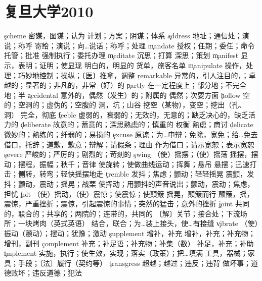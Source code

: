 \section{复旦大学2010}
\begin{multicols}{2}
\c{scheme}  \v 密谋，图谋；认为 \n 计划；方案；阴谋；体系
\c{address}  \n 地址；通信处；演说；称呼 \v 寄给；演说；向…说话；称呼；处理
\c{mandate}  \n 授权；任期；委任；命令 \vt 托管；批准 \vi 强制执行；委托办理
\c{meditate}  \vi 沉思；打算 \vt 深思；策划
\c{manifest}  \vt 显示，表明；证明；使显现 \a 明白的，明显的 \n 货单，旅客名单
\c{manipulate}  \vt 操作，处理；巧妙地控制；操纵；〔医〕推拿，调整
\c{remarkable}  \a 异常的，引人注目的，；卓越的；显著的；非凡的，非常（好）的
\c{partly}  \ad 在一定程度上；部分地；不完全地；半
\c{accidental}  \a 意外的，偶然（发生）的；附属的 \n 偶然；次要方面
\c{hollow}  \a 空的；空洞的；虚伪的；空腹的 \n 洞，坑；山谷 \v 挖空（某物），变空；挖出（孔、洞） \ad 完全，彻底
\c{feeble}  \a 虚弱的，衰弱的；无效的，无意的；缺乏决心的，缺乏活力的
\c{deliberate}  \a 故意的；蓄意的；深思熟虑的；慎重的 \vt 权衡 \vi 熟虑；商讨
\c{delicate}  \a 微妙的；熟练的；纤弱的；易损的
\c{excuse}  \vt 原谅；为…申辩；免除，宽免；给…免去 \n 借口，托辞；道歉，歉意；辩解；请假条；理由 \vi 作为借口；请示宽恕；表示宽恕
\c{severe}  \a 严峻的；严厉的；剧烈的；苛刻的
\c{swing}  \v （使）摇摆；（使）摇荡 \n 摇摆，摆动；摆程，振幅；秋千；音律 \vt 使旋转；使做曲线运动；挥舞；悬吊 \vi 悬摆；迅速打击；侧转，转弯；轻快摇摆地走
\c{tremble}  \vi 发抖；焦虑；颤动；轻轻摇晃 \n 震颤，发抖；颤动，震动；摇晃；战栗 \vt 使挥动；用颤抖的声音说出；颤动，震动；焦虑，担忧
\c{jolt}  \vt （使）摇动，（使）震惊；使震惊；使颠簸 \vi 摇晃，颠簸而行 \n 颠簸，摇，震惊，严重挫折；震惊，引起震惊的事情；突然的猛击；意外的挫折
\c{joint}  \a 共同的，联合的；共享的；两院的；连带的，共同的 \n 〔解〕关节；接合处；下流场所；一块烤肉（英式英语） \vt 结合，联合；为…装上接头，使…有接缝
\c{vibrate}  \v （使）振动（颤动）；摆动；犹豫；激动
\c{supplement}  \vt 增补，补充 \n 增补，补充；补充物；增刊，副刊
\c{complement}  \n 补充；补足语；补充物；补集（数） \vt 补足，补充；补助
\c{implement}  \vt 实施，执行；使生效，实现；落实（政策）；把…填满 \n 工具，器械；家具；手段；〔法〕履行（契约等）
\c{transgress}  \vt 超越；越过；违反；违背 \vi 做坏事；道德败坏；违反道德；犯法

\end{multicols}
